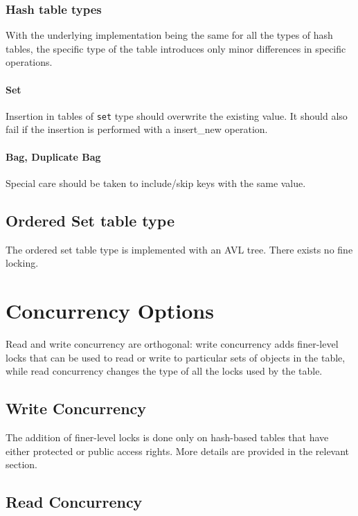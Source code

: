 \documentclass[aps,pre,preprint,nofootinbib]{revtex4}
\begin{document}
\subsubsection{Hash table types}     %

With the underlying implementation being the same for all the types of hash tables, the specific type of the table introduces only minor differences in specific operations.

\paragraph{Set}

Insertion in tables of \verb|set| type should overwrite the existing value.
It should also fail if the insertion is performed with a insert\_new operation.

\paragraph{Bag, Duplicate Bag}

Special care should be taken to include/skip keys with the same value.

\subsection{Ordered Set table type}

The ordered set table type is implemented with an AVL tree.
There exists no fine locking.

\section{Concurrency Options} \label{sec:concurrency_options}

Read and write concurrency are orthogonal:
write concurrency adds finer-level locks that can be used to read or write to particular sets of objects in the table, while read concurrency changes the type of all the locks used by the table.

\subsection{Write Concurrency}

The addition of finer-level locks is done only on hash-based tables that have either protected or public access rights.
More details are provided in the relevant section.

\subsection{Read Concurrency}
\end{document}
